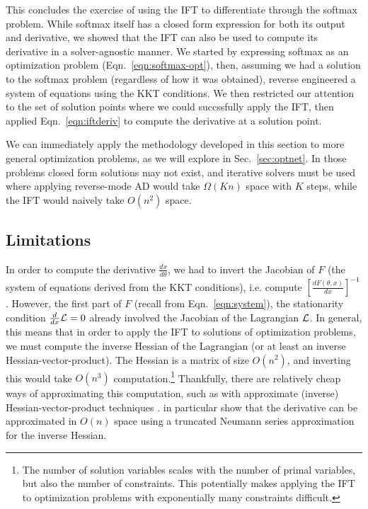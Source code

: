 \documentclass[11pt]{article}
\begin{document}
This concludes the exercise of using the IFT to differentiate through the softmax problem.
While softmax itself has a closed form expression for both its output and derivative,
we showed that the IFT can also be used to compute its derivative in a solver-agnostic manner.
We started by expressing softmax as an optimization problem (Eqn.~\ref{eqn:softmax-opt}),
then, assuming we had a solution to the softmax problem (regardless of how it was obtained),
reverse engineered a system of equations using the KKT conditions.
We then restricted our attention to the set of solution points where we could succssfully
apply the IFT,
then applied Eqn.~\ref{eqn:iftderiv} to compute the derivative at a solution point.

We can immediately apply the methodology developed in this section to more general
optimization problems, as we will explore in Sec.~\ref{sec:optnet}.
In those problems closed form solutions may not exist, and iterative solvers must be used
where applying reverse-mode AD would take $\Omega(Kn)$ space with $K$ steps,
while the IFT would naively take $O(n^2)$ space.


\subsection{Limitations}
\label{sec:limitations}
In order to compute the derivative $\frac{dx}{d\theta}$, we had to invert the Jacobian of $F$
(the system of equations derived from the KKT conditions),
i.e. compute $\left[\frac{dF(\theta,x)}{dx}\right]^{-1}$.
However, the first part of $F$ (recall from Eqn.~\ref{eqn:system}), the stationarity condition
$\frac{d}{dx}\mathcal{L} = 0$
already involved the Jacobian of the Lagrangian $\mathcal{L}$.
In general, this means that in order to apply the IFT to solutions of optimization problems,
we must compute the inverse Hessian of the Lagrangian (or at least an inverse Hessian-vector-product).
The Hessian is a matrix of size $O(n^2)$,
and inverting this would take $O(n^3)$ computation.\footnote{
The number of solution variables scales with the number of primal variables,
but also the number of constraints.
This potentially makes applying the IFT to optimization problems with exponentially
many constraints difficult.
}
Thankfully, there are relatively cheap ways of approximating this computation,
such as with approximate (inverse) Hessian-vector-product techniques
\citep{rajeswaran2019imaml,lorraine2019hoift}.
\citet{lorraine2019hoift} in particular show that the derivative can be approximated
in $O(n)$ space using a truncated Neumann series approximation for the inverse Hessian.
\end{document}
